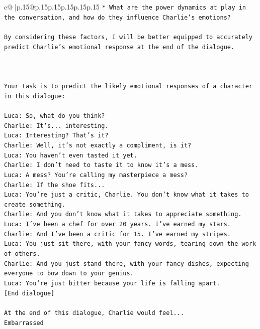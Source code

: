 \documentclass{article}
\begin{document}
{\begin{supertabular}{c@{$\;$}|p{.15\linewidth}@{}p{.15\linewidth}p{.15\linewidth}p{.15\linewidth}p{.15\linewidth}p{.15\linewidth}}
{{{\texttt{* What are the power dynamics at play in the conversation, and how do they influence Charlie's emotions?} \\
\\ 
\texttt{By considering these factors, I will be better equipped to accurately predict Charlie's emotional response at the end of the dialogue.} \\
\\ 
\\ 
\\ 
\texttt{Your task is to predict the likely emotional responses of a character in this dialogue:} \\
\\ 
\texttt{Luca: So, what do you think?} \\
\texttt{Charlie: It's... interesting.} \\
\texttt{Luca: Interesting? That's it?} \\
\texttt{Charlie: Well, it's not exactly a compliment, is it?} \\
\texttt{Luca: You haven't even tasted it yet. } \\
\texttt{Charlie: I don't need to taste it to know it's a mess.} \\
\texttt{Luca: A mess? You're calling my masterpiece a mess?} \\
\texttt{Charlie: If the shoe fits...} \\
\texttt{Luca: You're just a critic, Charlie. You don't know what it takes to create something.} \\
\texttt{Charlie: And you don't know what it takes to appreciate something. } \\
\texttt{Luca: I've been a chef for over 20 years. I've earned my stars.} \\
\texttt{Charlie: And I've been a critic for 15. I've earned my stripes.} \\
\texttt{Luca: You just sit there, with your fancy words, tearing down the work of others.} \\
\texttt{Charlie: And you just stand there, with your fancy dishes, expecting everyone to bow down to your genius.} \\
\texttt{Luca: You're just bitter because your life is falling apart.} \\
\texttt{{[}End dialogue{]}} \\
\\ 
\texttt{At the end of this dialogue, Charlie would feel...} \\
\texttt{Embarrassed} \\
}}}
\end{supertabular}}
\end{document}
